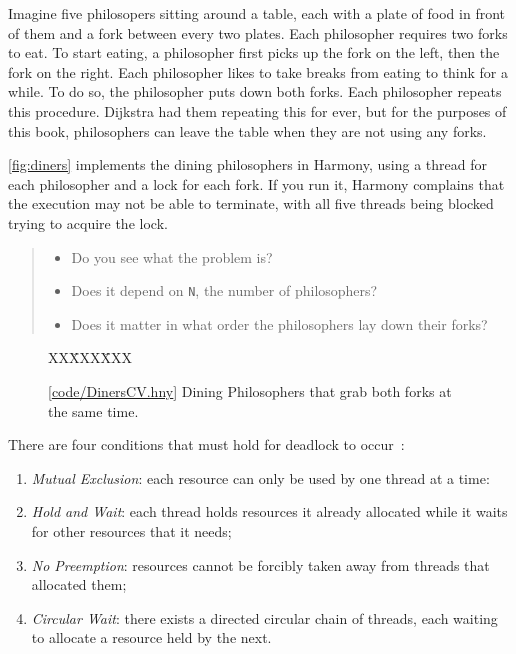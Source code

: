 \documentclass{report}
\newcommand{\harmonysource}[1]{
\begin{tabbing}
XX\=XXX\=XXX\kill
    
\end{tabbing}
}
\newcommand{\harmonylink}[1]{%
[\href{https://harmony.cs.cornell.edu/#1}{\underline{#1}}]%
}
\newenvironment{code}{
\tcolorbox
}{
\endtcolorbox
}
\begin{document}
Imagine five philosopers sitting around a table, each with a plate of food in
front of them and a fork between every two plates.  Each philosopher requires
two forks to eat.  To start eating, a philosopher first picks up the fork on
the left, then the fork on the right.  Each philosopher likes to take breaks
from eating to think for a while.  To do so, the philosopher puts down both
forks.  Each philosopher repeats this procedure.  Dijkstra had them repeating
this for ever, but for the purposes of this book, philosophers can leave
the table when they are not using any forks.

\autoref{fig:diners} implements the dining philosophers in Harmony, using a
thread for each philosopher and a lock for each fork.  If you
run it, Harmony complains that the execution may not be able to terminate,
with all five threads being blocked trying to acquire the lock.

\begin{quote}
\begin{itemize}
\item Do you see what the problem is?
\item Does it depend on \texttt{N}, the number of philosophers?
\item Does it matter in what order the philosophers lay down their forks?
\end{itemize}
\end{quote}


\begin{figure}
\begin{code}
\harmonysource{DinersCV}
\end{code}
\caption{\harmonylink{code/DinersCV.hny} Dining Philosophers that grab both forks at the same time.}
\label{fig:dinerscv}
\end{figure}

\noindent
There are four conditions that must hold for deadlock to occur~\cite{CES71}:
\begin{enumerate}
\item \emph{Mutual Exclusion}: each resource can only be used by one thread at a time:
\item \emph{Hold and Wait}: each thread holds resources it already allocated while it
waits for other resources that it needs;
\item \emph{No Preemption}: resources cannot be forcibly taken away from threads that
allocated them;
\item \emph{Circular Wait}: there exists a directed circular chain of threads, each waiting
to allocate a resource held by the next.
\end{enumerate}
\end{document}
